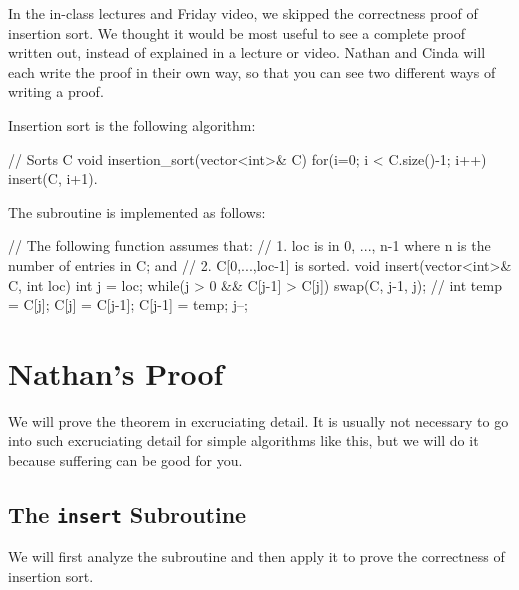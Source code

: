 \documentclass[11pt]{article}
\begin{document}

In the in-class lectures and Friday video, we skipped the correctness proof of insertion sort. We
thought it would be most useful to see a complete proof written out, instead of explained in a
lecture or video. Nathan and Cinda will each write the proof in their own way, so that you can see
two different ways of writing a proof.


Insertion sort is the following algorithm:

\begin{cpp}
// Sorts C
void insertion_sort(vector<int>& C){
    for(i=0; i < C.size()-1; i++){
        insert(C, i+1).
    }
}
\end{cpp}

The  subroutine is implemented as follows:

\begin{cpp}
// The following function assumes that:
// 1. loc is in {0, ..., n-1}  where n is the number of entries in C; and
// 2. C[0,...,loc-1] is sorted.
void insert(vector<int>& C, int loc){
    int j = loc;
    while(j > 0 && C[j-1] > C[j]){
        swap(C, j-1, j); // int temp = C[j]; C[j] = C[j-1]; C[j-1] = temp;
        j--;
    }
}
\end{cpp}

\section{Nathan's Proof}

We will prove the theorem in excruciating detail. It is usually not necessary to go into such
excruciating detail for simple algorithms like this, but we will do it because suffering can be good
for you.



\subsection{The \texttt{insert} Subroutine}
We will first analyze the  subroutine and then apply it to prove the correctness
of insertion sort.

\newcommand{\cv}[1]{ \ifmmode{\text{\cppinline{#1}}}\else{\cppinline{#1}} \fi }
\end{document}
